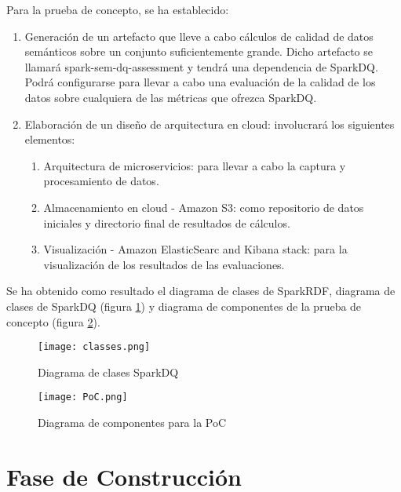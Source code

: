 Para la prueba de concepto, se ha establecido:

\begin{enumerate}
\item Generación de un artefacto que lleve a cabo cálculos de calidad de datos
  semánticos sobre un conjunto suficientemente grande. Dicho artefacto se
  llamará spark-sem-dq-assessment y tendrá una dependencia de SparkDQ. Podrá
  configurarse para llevar a cabo una evaluación de la calidad de los datos
  sobre cualquiera de las métricas que ofrezca SparkDQ.
\item Elaboración de un diseño de arquitectura en cloud: involucrará los
  siguientes elementos:
  \begin{enumerate}
  \item Arquitectura de microservicios: para llevar a cabo la captura y
    procesamiento de datos. 
  \item Almacenamiento en cloud - Amazon S3: como repositorio de datos iniciales
    y directorio final de resultados de cálculos.
  \item Visualización - Amazon ElasticSearc and Kibana stack: para la
    visualización de los resultados de las evaluaciones.  
  \end{enumerate}
\end{enumerate}

Se ha obtenido como resultado el diagrama de clases de SparkRDF, diagrama de clases
de SparkDQ (figura \ref{fig:classes}) y diagrama de componentes de la prueba de
concepto (figura \ref{fig:sequence-aws}).

\begin{figure}[!h]
  \begin{center}
    \texttt{[image: classes.png]} 
    \caption{Diagrama de clases SparkDQ}
    \label{fig:classes}
  \end{center}
\end{figure}

\begin{figure}[!h]
  \begin{center}
    \texttt{[image: PoC.png]} 
    \caption{Diagrama de componentes para la \acs{PoC}}
    \label{fig:sequence-aws}
  \end{center}
\end{figure}


\section{Fase de Construcción}

